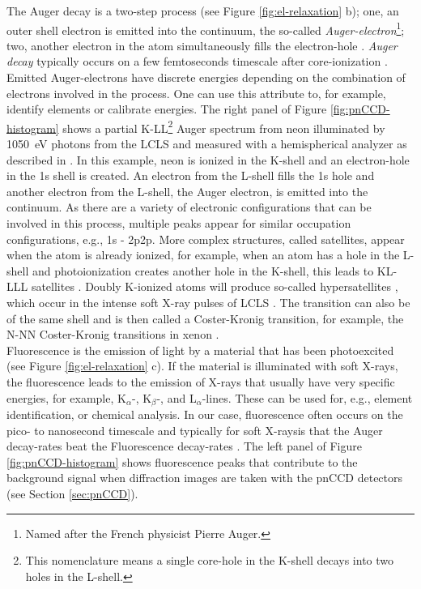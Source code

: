 The Auger decay is a two-step process (see Figure \ref{fig:el-relaxation} b); one, an outer shell electron is emitted into the continuum, the so-called \textit{Auger-electron}\footnote{Named after the French physicist Pierre Auger.}; two, another electron in the atom simultaneously fills the electron-hole \citep{schmidt-1997}. \textit{Auger decay} typically occurs on a few femtoseconds timescale after core-ionization \citep{Buth-2003-JCP}. Emitted Auger-electrons have discrete energies depending on the combination of electrons involved in the process. One can use this attribute to, for example, identify elements or calibrate energies. The right panel of Figure \ref{fig:pnCCD-histogram} shows a partial K-LL\footnote{This nomenclature means a single core-hole in the K-shell decays into two holes in the L-shell.} Auger spectrum from neon illuminated by \SI{1050}{\electronvolt} photons from the LCLS and measured with a hemispherical analyzer as described in \citep{Bucher-2014-Unpublished}. In this example, neon is ionized in the K-shell and an electron-hole in the 1s shell is created. An electron from the L-shell fills the 1s hole and another electron from the L-shell, the Auger electron, is emitted into the continuum. As there are a variety of electronic configurations that can be involved in this process, multiple peaks appear for similar occupation configurations, e.g., 1s - 2p2p. More complex structures, called satellites, appear when the atom is already ionized, for example, when an atom has a hole in the L-shell and photoionization creates another hole in the K-shell, this leads to KL-LLL satellites \citep{schmidt-1997}. Doubly K-ionized atoms will produce so-called hypersatellites \citep{Briand-1971-PRL}, which occur in the intense soft X-ray pulses of LCLS \citep{Berrah-2011-PNAS}. The transition can also be of the same shell and is then called a Coster-Kronig transition, for example, the N-NN Coster-Kronig transitions in xenon \citep{Coster-1935-Physica}.\\[1\baselineskip]
%
Fluorescence is the emission of light by a material that has been photoexcited (see Figure \ref{fig:el-relaxation} c). If the material is illuminated with soft X-rays, the fluorescence leads to the emission of X-rays that usually have very specific energies, for example, K$_\alpha$-, K$_\beta$-, and L$_\alpha$-lines. These can be used for, e.g., element identification, or chemical analysis. In our case, fluorescence often occurs on the pico- to nanosecond timescale \citep{Berezin-2011-ChemRev} and typically for soft X-raysis that the Auger decay-rates beat the Fluorescence decay-rates \cite{Young-2010-Nature}. The left panel of Figure \ref{fig:pnCCD-histogram} shows fluorescence peaks that contribute to the background signal when diffraction images are taken with the pnCCD detectors (see Section \ref{sec:pnCCD}).
